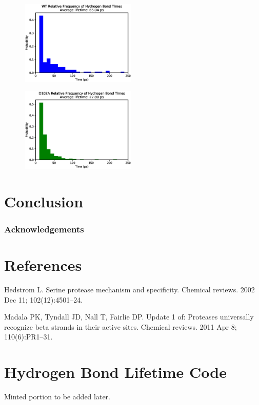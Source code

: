 \documentclass[12pt, twocolumn]{article}
\begin{document}
\begin{figure}[H]
    \centering
        \includegraphics[width=0.49\textwidth]{wt_hbond_times.eps}
    \caption{}
\end{figure}

\begin{figure}[H]
    \centering
        \includegraphics[width=0.49\textwidth]{d102a_hbond_times.eps}
    \caption{}
\end{figure}





\section{Conclusion}

\subsubsection*{Acknowledgements}

\section{References}
\begin{thebibliography}{9}
Hedstrom L. Serine protease mechanism and specificity.
Chemical reviews. 2002 Dec 11; 102(12):4501--24.

Madala PK, Tyndall JD, Nall T, Fairlie DP.\@
Update 1 of: Proteases universally recognize beta strands in their active sites.
Chemical reviews. 2011 Apr 8; 110(6):PR1--31.


\end{thebibliography}

\appendix

\onecolumn

\section{Hydrogen Bond Lifetime Code}

Minted portion to be added later.
\end{document}
